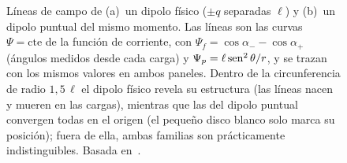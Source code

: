 \begin{figure}[ht]
\begin{minipage}[t]{0.47\textwidth}
\end{minipage}
\caption{Líneas de campo de (a)~un dipolo físico ($\pm q$ separadas $\ell$) y (b)~un dipolo puntual del mismo momento. Las líneas son las curvas
$\Psi=\text{cte}$ de la función de corriente, con $\Psi_{f}=\cos\alpha_{-}-\cos\alpha_{+}$ (ángulos medidos desde cada carga) y $\Psi_{p}=\ell\operatorname{sen}^{2}\theta/r$, y se trazan
con los mismos valores en ambos paneles. Dentro de la circunferencia de radio $1{,}5\,\ell$ el dipolo físico revela su estructura (las líneas nacen y mueren en las
cargas), mientras que las del dipolo puntual convergen todas en el origen (el pequeño disco blanco solo marca su posición); fuera de ella, ambas familias son prácticamente indistinguibles. Basada en~\cite{FIGURAS-T2}.}
\label{fig:esquema-dipolo}
\end{figure}
